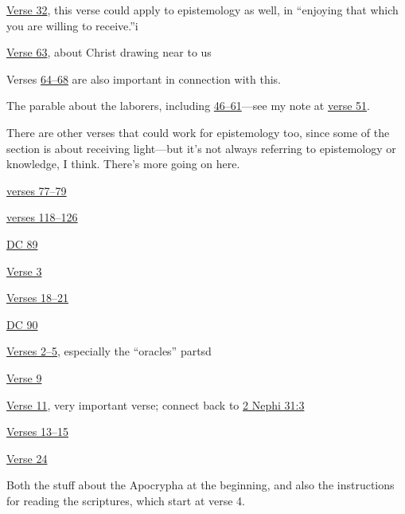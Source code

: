 \begin{compactdesc}
				\begin{compactitem}
					\item \hyperref[DC88-32]{Verse 32}, this verse could apply to epistemology as well, in ``enjoying that which you are willing to receive.''i
					\item \hyperref[DC88-63]{Verse 63}, about Christ drawing near to us
						\begin{compactitem}
							\item Verses \hyperref[DC88-64]{64--68} are also important in connection with this.
						\end{compactitem}
					\item The parable about the laborers, including \hyperref[DC88-46]{46--61}---see my note at \hyperref[DC88-51]{verse 51}.
					\item There are other verses that could work for epistemology too, since some of the section is about receiving light---but it's not always referring to epistemology or knowledge, I think. There's more going on here.
					\item \hyperref[DC88-77]{verses 77--79}					
					\item \hyperref[DC88-118]{verses 118--126}
				\end{compactitem}
			\item \hyperref[DC89]{DC 89}
				\begin{compactitem}
					\item \hyperref[DC89-3]{Verse 3}
					\item \hyperref[DC89-18]{Verses 18--21}
				\end{compactitem}
			\item \hyperref[DC90]{DC 90}
				\begin{compactitem}
					\item \hyperref[DC90-2]{Verses 2--5}, especially the ``oracles'' partsd
					\item \hyperref[DC90-9]{Verse 9}
					\item \hyperref[DC90-11]{Verse 11}, very important verse; connect back to \hyperref[2NEPHI-31-3]{2 Nephi 31:3}
					\item \hyperref[DC90-13]{Verses 13--15}
					\item \hyperref[DC90-24]{Verse 24}
				\end{compactitem}
			\item[{\hyperref[DC91]{DC 91}}]
				\begin{compactitem}
					\item Both the stuff about the Apocrypha at the beginning, and also the instructions for reading the scriptures, which start at verse 4.

\end{compactitem}
\end{compactdesc}
